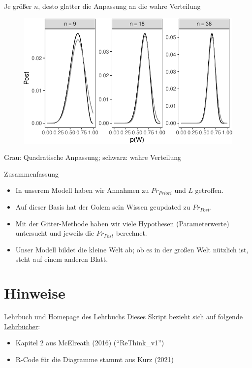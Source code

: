 \documentclass[
  ngerman,
  ignorenonframetext,
]{beamer}
\providecommand{\tightlist}{%
  \setlength{\itemsep}{0pt}\setlength{\parskip}{0pt}}
\begin{document}
\begin{frame}{Je größer \(n\), desto glatter die Anpassung an die wahre
Verteilung}
\protect\hypertarget{je-gruxf6uxdfer-n-desto-glatter-die-anpassung-an-die-wahre-verteilung}{}
\begin{figure}[H]
\includegraphics[width=1\linewidth]{unnamed-chunk-32-1} \end{figure}

Grau: Quadratische Anpassung; schwarz: wahre Verteilung
\end{frame}

\begin{frame}{Zusammenfassung}
\protect\hypertarget{zusammenfassung-1}{}
\begin{itemize}
\item
  In unserem Modell haben wir Annahmen zu \(Pr_{Priori}\) und \(L\)
  getroffen.
\item
  Auf dieser Basis hat der Golem sein Wissen geupdated zu \(Pr_{Post}\).
\item
  Mit der Gitter-Methode haben wir viele Hypothesen (Parameterwerte)
  untersucht und jeweils die \(Pr_{Post}\) berechnet.
\item
  Unser Modell bildet die kleine Welt ab; ob es in der großen Welt
  nützlich ist, steht auf einem anderen Blatt.
\end{itemize}
\end{frame}

\hypertarget{hinweise}{%
\section{Hinweise}\label{hinweise}}

\begin{frame}{Lehrbuch und Homepage des Lehrbuchs}
\protect\hypertarget{lehrbuch-und-homepage-des-lehrbuchs}{}
Dieses Skript bezieht sich auf folgende
\protect\hyperlink{literatur}{Lehrbücher}:

\begin{itemize}
\tightlist
\item
  Kapitel 2 aus McElreath (2016) (\enquote{ReThink\_v1})
\item
  R-Code für die Diagramme stammt aus Kurz (2021)
\end{itemize}
\end{frame}
\end{document}
